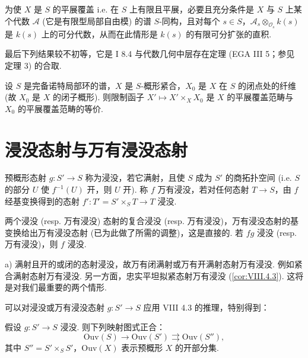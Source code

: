 \begin{proposition}\label{prop:IX.1.9}
为使 $X$ 是 $S$ 的平展覆盖 i.e. 在 $S$ 上有限且平展，必要且充分条件是 $X$ 与 $S$ 上某个代数 $\mathcal{A}$ (它是有限型局部自由模) 的谱 $S$-同构，且对每个 $s \in S$，$\mathcal{A}_s \otimes_{\mathcal{O}_s} k(s)$ 是 $k(s)$ 上的可分代数，从而在此情形是 $k(s)$ 的有限可分扩张的直积.
\end{proposition}

最后下列结果较不初等，它是 I 8.4 与代数几何中层存在定理 (EGA III 5；参见 \cite{exp09-1} 定理 3) 的合取.

\begin{theorem}\label{thm:IX.1.10}
设 $S$ 是完备诺特局部环的谱，$X$ 是 $S$-概形紧合，$X_0$ 是 $X$ 在 $S$ 的闭点处的纤维 (故 $X_0$ 是 $X$ 的闭子概形). 则限制函子 $X' \mapsto X' \times_X X_0$ 是 $X$ 的平展覆盖范畴与 $X_0$ 的平展覆盖范畴的等价.
\end{theorem}

\section{浸没态射与万有浸没态射}

\begin{definition}\label{def:IX.2.1}
预概形态射 $g \colon S' \to S$ 称为浸没，若它满射，且使 $S$ 成为 $S'$ 的商拓扑空间 (i.e. $S$ 的部分 $U$ 使 $f^{-1}(U)$ 开，则 $U$ 开). 称 $f$ 万有浸没，若对任何态射 $T \to S$，由 $f$ 经基变换得到的态射 $f' \colon T' = S' \times_S T \to T$ 浸没.
\end{definition}

两个浸没 (resp. 万有浸没) 态射的复合浸没 (resp. 万有浸没)，万有浸没态射的基变换给出万有浸没态射 (已为此做了所需的调整)，这是直接的. 若 $fg$ 浸没 (resp. 万有浸没)，则 $f$ 浸没.

\begin{example}\label{exa:IX.2.2}
a) 满射且开的或闭的态射浸没，故万有闭满射或万有开满射态射万有浸没. 例如紧合满射态射万有浸没. 另一方面，忠实平坦拟紧态射万有浸没 (\cref{cor:VIII.4.3}). 这将是对我们最重要的两个情形.
\end{example}

可以对浸没或万有浸没态射 $g \colon S' \to S$ 应用 VIII 4.3 的推理，特别得到：

\begin{proposition}\label{prop:IX.2.3}
假设 $g \colon S' \to S$ 浸没. 则下列映射图式正合：
\[
\mathrm{Ouv}(S) \longrightarrow \mathrm{Ouv}(S') \rightrightarrows \mathrm{Ouv}(S''),
\]
其中 $S'' = S' \times_S S'$，$\mathrm{Ouv}(X)$ 表示预概形 $X$ 的开部分集.
\end{proposition}


